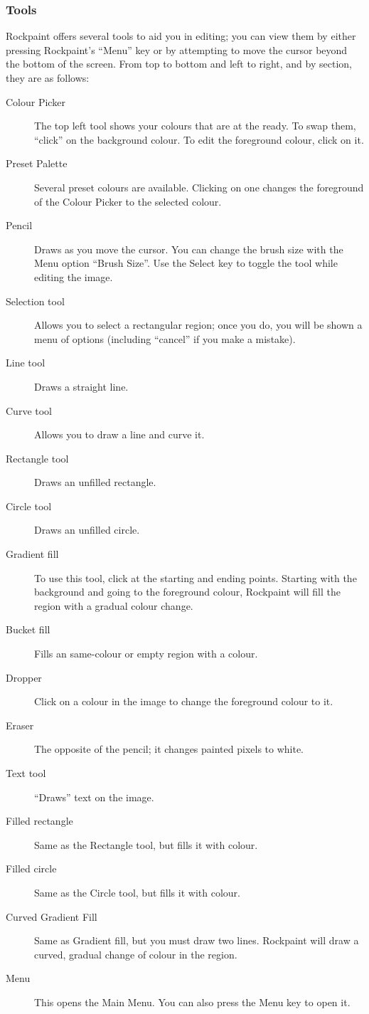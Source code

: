 \subsubsection{Tools}
Rockpaint offers several tools to aid you in editing; you can view them by
either pressing Rockpaint's ``Menu'' key or by attempting to move the cursor
beyond the bottom of the screen. From top to bottom and left to right, and
by section, they are as follows:
\begin{description}
    \item[Colour Picker]
        The top left tool shows your colours that are at the ready. To
        swap them, ``click'' on the background colour. To edit the foreground colour,
        click on it.
    \item[Preset Palette]
        Several preset colours are available. Clicking on one changes
        the foreground of the Colour Picker to the selected colour.
    \item[Pencil]
        Draws as you move the cursor. You can change the brush size with the
        Menu option ``Brush Size''. Use the Select key to toggle the tool while editing
        the image.
    \item[Selection tool]
        Allows you to select a rectangular region; once you do, you
        will be shown a menu of options (including ``cancel'' if you make a mistake).
    \item[Line tool]
        Draws a straight line.
    \item[Curve tool]
        Allows you to draw a line and curve it.
    \item[Rectangle tool]
        Draws an unfilled rectangle.
    \item[Circle tool]
        Draws an unfilled circle.
    \item[Gradient fill]
        To use this tool, click at the starting and ending points.
        Starting with the background and going to the foreground colour, Rockpaint
        will fill the region with a gradual colour change.
    \item[Bucket fill]
        Fills an same-colour or empty region with a colour.
    \item[Dropper]
        Click on a colour in the image to change the foreground colour to it.
    \item[Eraser]
        The opposite of the pencil; it changes painted pixels to white.
    \item[Text tool]
        ``Draws'' text on the image.
    \item[Filled rectangle]
        Same as the Rectangle tool, but fills it with colour.
    \item[Filled circle]
        Same as the Circle tool, but fills it with colour.
    \item[Curved Gradient Fill]
        Same as Gradient fill, but you must draw two lines.
        Rockpaint will draw a curved, gradual change of colour in the region.
    \item[Menu]
        This opens the Main Menu. You can also press the Menu key to open it.
\end{description}

